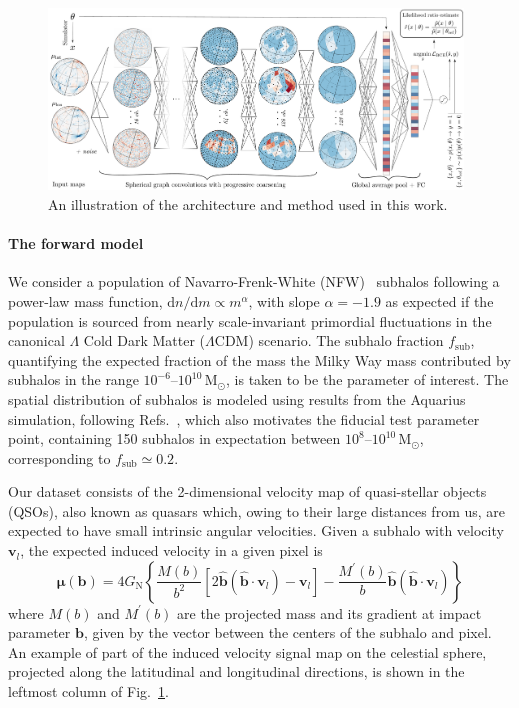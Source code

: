 \documentclass[]{article}
\begin{document}
\begin{figure}[!htbp]
\centering
\includegraphics[width=0.98\textwidth]{figures/drawing.pdf}
\caption{An illustration of the architecture and method used in this work.}
\label{fig:model}
\end{figure}

\paragraph{The forward model} We consider a population of Navarro-Frenk-White (NFW)~\cite{Navarro:1995iw} subhalos following a power-law mass function, $\mathrm dn / \mathrm dm \propto m^\alpha$, with slope $\alpha = -1.9$ as expected if the population is sourced from nearly scale-invariant primordial fluctuations in the canonical $\Lambda$ Cold Dark Matter ($\Lambda$CDM) scenario. 
The subhalo fraction $f_\mathrm{sub}$, quantifying the expected fraction of the mass the Milky Way mass contributed by subhalos in the range $10^{-6}$--$10^{10}\,\mathrm{M}_\odot$, is taken to be the parameter of interest. The spatial distribution of subhalos is modeled using results from the Aquarius simulation, following Refs.~\cite{Hutten:2016jko,Springel:2008cc}, which also motivates the fiducial test parameter point, containing 150 subhalos in expectation between $10^{8}$--$10^{10}\,\mathrm{M}_\odot$, corresponding to $f_\mathrm{sub} \simeq 0.2$.

Our dataset consists of the 2-dimensional velocity map of quasi-stellar objects (QSOs), also known as quasars which, owing to their large distances from us, are expected to have small intrinsic angular velocities. 
Given a subhalo with velocity $\mathbf{v}_{l}$, the expected induced velocity in a given pixel is~\cite{VanTilburg:2018ykj,Mishra-Sharma:2020ynk}
\begin{equation}
    \boldsymbol{\mu}(\mathbf{b})=4 G_{\mathrm{N}}\left\{\frac{M(b)}{b^{2}}\left[2 \hat{\mathbf{b}}\left(\hat{\mathbf{b}} \cdot \mathbf{v}_{l}\right)-\mathbf{v}_{l}\right]-\frac{M^{\prime}(b)}{b} \hat{\mathbf{b}}\left(\hat{\mathbf{b}} \cdot \mathbf{v}_{l}\right)\right\}
\end{equation}
where $M(b)$ and $M^{\prime}(b)$ are the projected mass and its gradient at impact parameter $\mathbf{b}$, given by the vector between the centers of the subhalo and pixel. An example of part of the induced velocity signal map on the celestial sphere, projected along the latitudinal and longitudinal directions, is shown in the leftmost column of Fig.~\ref{fig:model}.
\end{document}
